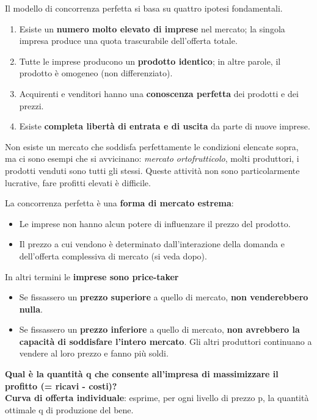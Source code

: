 \documentclass[../main.tex]{subfiles}
\begin{document}
Il modello di concorrenza perfetta si basa su quattro ipotesi fondamentali.
\begin{enumerate}
    \item Esiste un \textbf{numero molto elevato di imprese} nel mercato; la singola impresa produce una quota trascurabile dell'offerta totale.
    \item Tutte le imprese producono un \textbf{prodotto identico}; in altre parole, il prodotto è omogeneo (non differenziato).
    \item Acquirenti e venditori hanno una \textbf{conoscenza perfetta} dei prodotti e dei prezzi.
    \item Esiste \textbf{completa libertà di entrata e di uscita} da parte di nuove imprese.
\end{enumerate}

Non esiste un mercato che soddisfa perfettamente le condizioni elencate sopra, ma ci sono esempi che si avvicinano: \emph{mercato ortofrutticolo}, molti produttori, i prodotti venduti sono tutti gli stessi. Queste attività non sono particolarmente lucrative, fare profitti elevati è difficile.

La concorrenza perfetta è una \textbf{forma di mercato estrema}:
\begin{itemize}
    \item Le imprese non hanno alcun potere di influenzare il prezzo del prodotto.
    \item Il prezzo a cui vendono è determinato dall'interazione della domanda e dell'offerta complessiva di mercato (si veda dopo).
\end{itemize}

In altri termini le \textbf{imprese sono price-taker}
\begin{itemize}
    \item Se fissassero un \textbf{prezzo superiore} a quello di mercato, \textbf{non venderebbero nulla}.
    \item Se fissassero un \textbf{prezzo inferiore} a quello di mercato, \textbf{non avrebbero la capacità di soddisfare l'intero mercato}. Gli altri produttori continuano a vendere al loro prezzo e fanno più soldi.
\end{itemize}

\textbf{Qual è la quantità q che consente all'impresa di massimizzare il profitto (= ricavi - costi)?} \\

\textbf{Curva di offerta individuale}: esprime, per ogni livello di prezzo p, la quantità ottimale q di produzione del bene.
\end{document}
